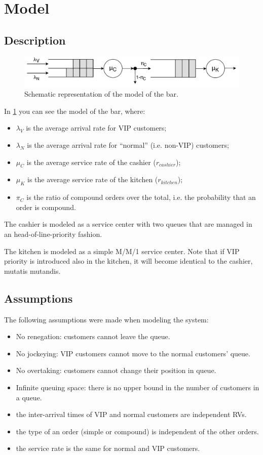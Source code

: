 \section{Model}

\subsection{Description}
\begin{figure}[h!]
    \centering
    \includegraphics[width=.75\textwidth]{figs/qt_model.pdf}
    \caption{Schematic representation of the model of the bar.}
    \label{fig:model}
\end{figure}

In \cref{fig:model} you can see the model of the bar, where:
\begin{itemize}
    \item $\lambda_V$ is the average arrival rate for VIP customers;
    \item $\lambda_N$ is the average arrival rate for ``normal'' (i.e. non-VIP) customers;
    \item $\mu_C$ is the average service rate of the cashier ($r_{cashier}$);
    \item $\mu_K$ is the average service rate of the kitchen ($r_{kitchen}$);
    \item $\pi_C$ is the ratio of compound orders over the total, i.e. the 
        probability that an order is compound.
\end{itemize}

The cashier is modeled as a service center with two queues that are managed 
in an head-of-line-priority fashion.

The kitchen is modeled as a simple M/M/1 service center. Note that if VIP 
priority is introduced also in the kitchen, it will become identical to the 
cashier, mutatis mutandis.

\subsection{Assumptions}
The following assumptions were made when modeling the system:
\begin{itemize}
    \item No renegation: customers cannot leave the queue.
    \item No jockeying: VIP customers cannot move to the normal customers' queue.
    \item No overtaking: customers cannot change their position in queue.
    \item Infinite queuing space: there is no upper bound in the number of 
        customers in a queue.
    \item the inter-arrival times of VIP and normal customers are independent 
        RVs.
    \item the type of an order (simple or compound) is independent of the other
        orders.
    \item the service rate is the same for normal and VIP customers.
\end{itemize}

